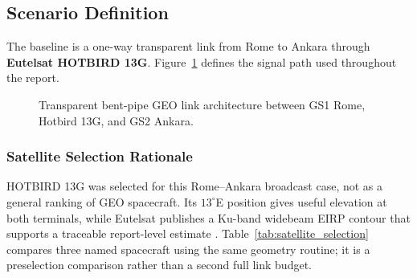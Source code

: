 \subsection{Scenario Definition}
The baseline is a one-way transparent link from Rome to Ankara through \textbf{Eutelsat HOTBIRD 13G}. Figure~\ref{fig:link_architecture} defines the signal path used throughout the report.
\begin{figure}[H]
    \centering
    \caption{Transparent bent-pipe GEO link architecture between GS1 Rome, Hotbird 13G, and GS2 Ankara.}
    \label{fig:link_architecture}
\end{figure}

\subsubsection{Satellite Selection Rationale}
HOTBIRD 13G was selected for this Rome--Ankara broadcast case, not as a general ranking of GEO spacecraft. Its $13^\circ$E position gives useful elevation at both terminals, while Eutelsat publishes a Ku-band widebeam EIRP contour that supports a traceable report-level estimate \cite{eutelsat}. Table~\ref{tab:satellite_selection} compares three named spacecraft using the same geometry routine; it is a preselection comparison rather than a second full link budget.

